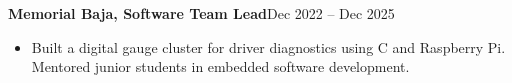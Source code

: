 \textbf{Memorial Baja, Software Team Lead}\hfill Dec 2022 -- Dec 2025\par
\begin{itemize}
  \item Built a digital gauge cluster for driver diagnostics using C and Raspberry Pi. Mentored junior students in embedded software development.
\end{itemize}
